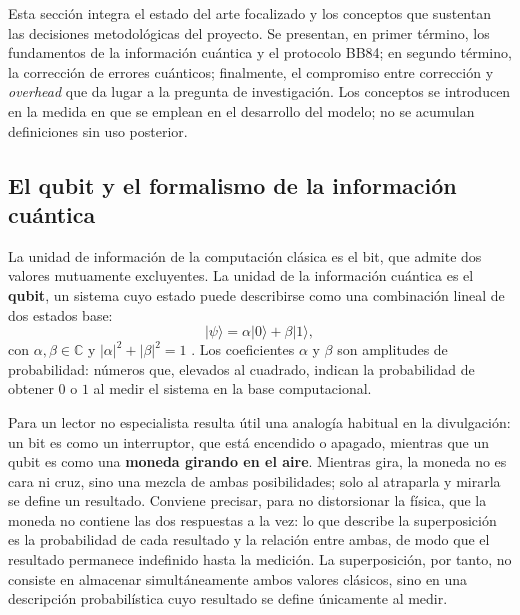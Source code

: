 \documentclass[12pt]{report}
\begin{document}
Esta sección integra el estado del arte focalizado y los conceptos que sustentan
las decisiones metodológicas del proyecto. Se presentan, en primer término, los
fundamentos de la información cuántica y el protocolo BB84; en segundo término,
la corrección de errores cuánticos; finalmente, el compromiso entre corrección y
\textit{overhead} que da lugar a la pregunta de investigación. Los conceptos se
introducen en la medida en que se emplean en el desarrollo del modelo; no se
acumulan definiciones sin uso posterior.

\subsection{El qubit y el formalismo de la información cuántica}

La unidad de información de la computación clásica es el bit, que admite dos
valores mutuamente excluyentes. La unidad de la información cuántica es el
\textbf{qubit}, un sistema cuyo estado puede describirse como una combinación
lineal de dos estados base:
\begin{equation}
|\psi\rangle = \alpha|0\rangle + \beta|1\rangle,
\label{eq:qubit}
\end{equation}
con $\alpha, \beta \in \mathbb{C}$ y $|\alpha|^2 + |\beta|^2 = 1$
\citep{nielsen2010}. Los coeficientes $\alpha$ y $\beta$ son amplitudes de
probabilidad: números que, elevados al cuadrado, indican la probabilidad de
obtener $0$ o $1$ al medir el sistema en la base computacional.

Para un lector no especialista resulta útil una analogía habitual en la
divulgación: un bit es como un interruptor, que está encendido o apagado,
mientras que un qubit es como una \textbf{moneda girando en el aire}. Mientras
gira, la moneda no es cara ni cruz, sino una mezcla de ambas posibilidades; solo
al atraparla y mirarla se define un resultado. Conviene precisar, para no
distorsionar la física, que la moneda no contiene las dos respuestas a la vez: lo
que describe la superposición es la probabilidad de cada resultado y la relación
entre ambas, de modo que el resultado permanece indefinido hasta la medición. La
superposición, por tanto, no consiste en almacenar simultáneamente ambos valores
clásicos, sino en una descripción probabilística cuyo resultado se define
únicamente al medir.
\end{document}
